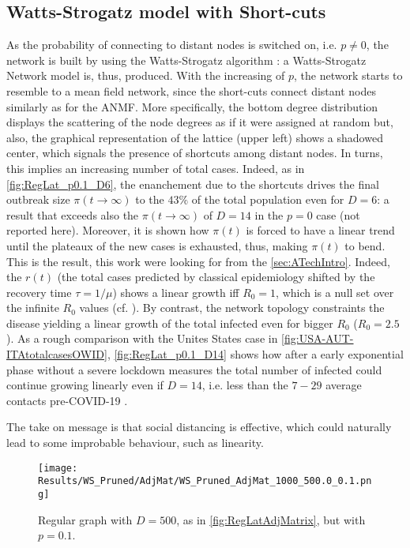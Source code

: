 \documentclass[a4paper,10pt,twoside]{book} %
\theoremstyle{definition}
\begin{document}
\subsection{Watts-Strogatz model with Short-cuts}
\label{sec:RegularGraph_p0.1}
As the probability of connecting to distant nodes is switched on, i.e. $p \neq 0$, the network is built by using the Watts-Strogatz algorithm \cite{watts:1998_SWconnectiveDynamics}: a Watts-Strogatz Network model is, thus, produced.
With the increasing of $p$, the network starts to resemble to a mean field network, since the short-cuts connect distant nodes similarly as for the ANMF.
More specifically, the bottom degree distribution displays the scattering of the node degrees as if it were assigned at random but, also, the graphical representation of the lattice (upper left) shows a shadowed center, which signals the presence of shortcuts among distant nodes. In turns, this implies an increasing number of total cases. Indeed, as in \autoref{fig:RegLat_p0.1_D6}, the enanchement due to the shortcuts drives the final outbreak size $\pi(t \to \infty)$ to the $43\%$ of the total population even for $D=6$: a result that exceeds also the $\pi(t \to \infty)$ of $D = 14$ in the $p = 0$ case (not reported here). Moreover, it is shown how $\pi(t)$ is forced to have a linear trend until the plateaux of the new cases is exhausted, thus, making $\pi(t)$ to bend. This is the result, this work were looking for from the \autoref{sec:ATechIntro}. Indeed, the $r(t)$ (the total cases predicted by classical epidemiology shifted by the recovery time $\tau = 1/\mu$) shows a linear growth iff $R_0 = 1$, which is a null set over the infinite $R_0$ values (cf. \cite{Thurner::NetBasedExpl}). By contrast, the network topology constraints the disease yielding a linear growth of the total infected even for bigger $R_0$ ($R_0 = 2.5$). As a rough comparison with the Unites States case in \autoref{fig:USA-AUT-ITAtotalcasesOWID}, \autoref{fig:RegLat_p0.1_D14} shows how after a early exponential phase without a severe lockdown measures the total number of infected could continue growing linearly even if $D = 14$, i.e. less than the $7-29$ average contacts pre-COVID-19 \cite{Liu::2021_Review_SContactPattern}.

The take on message is that social distancing is effective, which could naturally lead to some improbable behaviour, such as linearity.

\begin{figure}[t]
	\centering
	\texttt{[image: Results/WS\_Pruned/AdjMat/WS\_Pruned\_AdjMat\_1000\_500.0\_0.1.png]}
	\caption{Regular graph with $D = 500$, as in \autoref{fig:RegLatAdjMatrix}, but with $p = 0.1$.}
	\label{fig:RL_adjmat_p0.1}
\end{figure}
\end{document}
